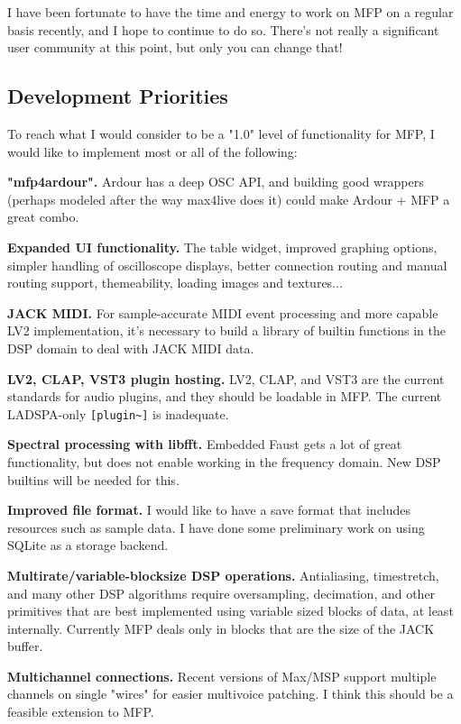 \documentclass[a4paper]{article}
\begin{document}
I have been fortunate to have the time and energy to work on MFP
on a regular basis recently, and I hope to continue to do so.
There's not really a significant user community at this point,
but only you can change that!

\subsection{Development Priorities}

To reach what I would consider to be a "1.0" level of
functionality for MFP, I would like to implement most or all of
the following:

{\bf "mfp4ardour".} Ardour has a deep OSC API, and building good
wrappers (perhaps modeled after the way max4live does it) could
make Ardour + MFP a great combo.

{\bf Expanded UI functionality.} The table widget, improved
graphing options, simpler handling of oscilloscope displays,
better connection routing and manual routing support, themeability,
loading images and textures...

{\bf JACK MIDI.} For sample-accurate MIDI event processing and
more capable LV2 implementation, it's necessary to build a
library of builtin functions in the DSP domain to deal with JACK
MIDI data.

{\bf LV2, CLAP, VST3 plugin hosting.} LV2, CLAP, and VST3 are the
current standards for audio plugins, and they should be loadable
in MFP. The current LADSPA-only {\tt [plugin\textasciitilde]} is
inadequate.

{\bf Spectral processing with libfft.} Embedded Faust gets a lot
of great functionality, but does not enable working in the
frequency domain. New DSP builtins will be needed for this.

{\bf Improved file format.} I would like to have a save format
that includes resources such as sample data. I have done some
preliminary work on using SQLite as a storage backend.

{\bf Multirate/variable-blocksize DSP operations.} Antialiasing,
timestretch, and many other DSP algorithms require oversampling,
decimation, and other primitives that are best implemented using
variable sized blocks of data, at least internally. Currently MFP
deals only in blocks that are the size of the JACK buffer.

{\bf Multichannel connections.} Recent versions of Max/MSP
support multiple channels on single "wires" for easier multivoice
patching. I think this should be a feasible extension to MFP.
\end{document}
